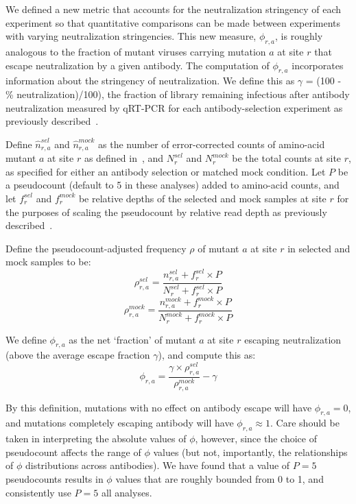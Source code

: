 \documentclass[11pt]{article}
\begin{document}
We defined a new metric that accounts for the neutralization stringency of each experiment so that quantitative comparisons can be made between experiments with varying neutralization stringencies.
This new measure, $\phi_{r,a}$, is roughly analogous to the fraction of mutant viruses carrying mutation $a$ at site $r$ that escape neutralization by a given antibody.
The computation of $\phi_{r,a}$ incorporates information about the stringency of neutralization. 
We define this as  $\gamma$ = (100 - \% neutralization)/100), the fraction of library remaining infectious after antibody neutralization measured by qRT-PCR for each antibody-selection experiment as previously described~\cite{doud2017complete}.

Define $\hat{n}_{r,a}^{sel}$ and $\hat{n}_{r,a}^{mock}$ as the number of error-corrected counts of amino-acid mutant $a$ at site $r$ as defined in~\cite{doud2017complete}, and $N_r^{sel}$ and $N_r^{mock}$ be the total counts at site $r$, as specified for either an antibody selection or matched mock condition.
Let $P$ be a pseudocount (default to 5 in these analyses) added to amino-acid counts, and let $f_{r}^{sel}$ and $f_{r}^{mock}$ be relative depths of the selected and mock samples at site $r$ for the purposes of scaling the pseudocount by relative read depth as previously described~\cite{doud2017complete}.

Define the pseudocount-adjusted frequency $\rho$ of mutant $a$ at site $r$ in selected and mock samples to be:
$$\rho_{r,a}^{sel} = \frac{n_{r,a}^{sel}+f_r^{sel}\times P}{N_r^{sel}+f_r^{sel}\times  P}$$
$$\rho_{r,a}^{mock} = \frac{n_{r,a}^{mock}+f_r^{mock}\times P}{N_r^{mock}+f_r^{mock}\times  P}$$

We define $\phi_{r,a}$ as the net `fraction' of mutant $a$ at site $r$ escaping neutralization (above the average escape fraction $\gamma$), and compute this as:
$$\phi_{r,a} = \frac{\gamma \times \rho_{r,a}^{sel}}{\rho_{r,a}^{mock}} - \gamma$$

By this definition, mutations with no effect on antibody escape will have $\phi_{r,a} =0$, and mutations completely escaping antibody will have $\phi_{r,a} \approx 1$.
Care should be taken in interpreting the absolute values of $\phi$, however, since the choice of pseudocount affects the range of $\phi$ values (but not, importantly, the relationships of $\phi$ distributions across antibodies).
We have found that a value of $P=5$ pseudocounts results in $\phi$ values that are roughly bounded from 0 to 1, and consistently use $P=5$ all analyses.
\end{document}
